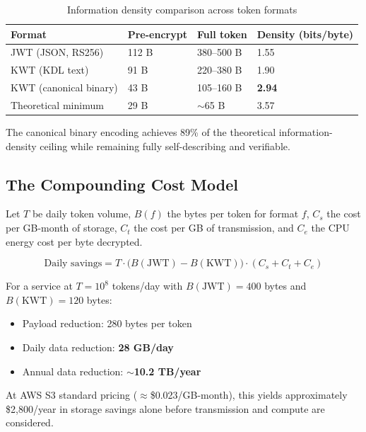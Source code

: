 \documentclass[11pt, letterpaper]{article}
\begin{document}
\begin{table}[H]
\centering
\caption{Information density comparison across token formats}
\small
\begin{tabularx}{\linewidth}{L{3.6cm} C{2.2cm} C{2.2cm} C{2.6cm}}
\toprule
{}
\color{white}\textbf{Format} &
\color{white}\textbf{Pre-encrypt} &
\color{white}\textbf{Full token} &
\color{white}\textbf{Density (bits/byte)} \\
\midrule
JWT (JSON, RS256)         & 112 B & 380--500 B & 1.55 \\
KWT (KDL text)            & 91 B  & 220--380 B & 1.90 \\
KWT (canonical binary)    & 43 B  & 105--160 B & \textbf{2.94} \\
Theoretical minimum       & 29 B  & $\sim$65 B  & 3.57 \\
\bottomrule
\end{tabularx}
\end{table}

The canonical binary encoding achieves 89\% of the theoretical
information-density ceiling while remaining fully self-describing and verifiable.

\subsection{The Compounding Cost Model}

Let $T$ be daily token volume, $B(f)$ the bytes per token for format $f$,
$C_s$ the cost per GB-month of storage, $C_t$ the cost per GB of transmission,
and $C_e$ the CPU energy cost per byte decrypted.

\begin{equation}
  \text{Daily savings} = T \cdot \bigl(B(\text{JWT}) - B(\text{KWT})\bigr)
                         \cdot (C_s + C_t + C_e)
  \label{eq:savings}
\end{equation}

For a service at $T = 10^8$ tokens/day with $B(\text{JWT}) = 400$ bytes
and $B(\text{KWT}) = 120$ bytes:

\begin{itemize}[noitemsep]
  \item Payload reduction: 280 bytes per token
  \item Daily data reduction: \textbf{28 GB/day}
  \item Annual data reduction: \textbf{$\sim$10.2 TB/year}
\end{itemize}

At AWS S3 standard pricing ($\approx$\$0.023/GB-month), this yields
approximately \$2{,}800/year in storage savings alone before transmission
and compute are considered.
\end{document}
